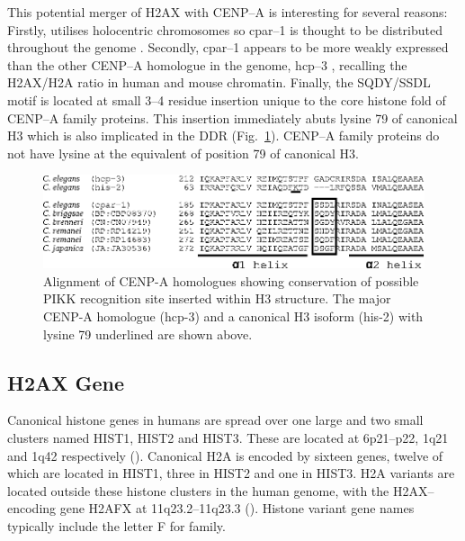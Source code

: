 This potential merger of H2AX with \mbox{CENP--A} is interesting for
several reasons: Firstly,  utilises holocentric
chromosomes so \mbox{cpar--1} is thought to be distributed throughout
the genome \citep{MMH+05}. Secondly, \mbox{cpar--1} appears to be more
weakly expressed than the other \mbox{CENP--A} homologue in the
 genome, \mbox{hcp--3} \citep{MMH+05}, recalling
the H2AX/H2A ratio in human and mouse chromatin. Finally, the
SQDY/SSDL motif is located at small 3--4 residue insertion unique to
the core histone fold of \mbox{CENP--A} family proteins.
This insertion immediately abuts lysine 79 of canonical H3 which is
also implicated in the DDR
(Fig.\ \ref{fig:h2ax-review:celegans})\@. \mbox{CENP--A} family
proteins do not have lysine at the equivalent of position 79 of
canonical H3.

\begin{figure}
\centering
\includegraphics{h2ax-review/figs/Fig1}
\caption[Alignment of  \mbox{CENP-A} homologues]%
        {Alignment of  \mbox{CENP-A}
          homologues showing conservation of possible PIKK recognition
          site inserted within H3 structure. The major
           \mbox{CENP-A} homologue
          (\mbox{hcp-3}) and a canonical H3 isoform (\mbox{his-2})
          with lysine 79 underlined are shown above.}
\label{fig:h2ax-review:celegans}
\end{figure}

\subsection{H2AX Gene}
Canonical histone genes in humans are spread over one large and two
small clusters named HIST1, HIST2 and HIST3. These are located at
6p21--p22, 1q21 and 1q42 respectively
().
Canonical H2A is encoded by sixteen genes, twelve of which are located
in HIST1, three in HIST2 and one in HIST3. H2A variants are located
outside these histone clusters in the human genome, with the
H2AX--encoding gene H2AFX at 11q23.2--11q23.3 \citep{IZP+94}
().
Histone variant gene names typically include the letter F for family.

